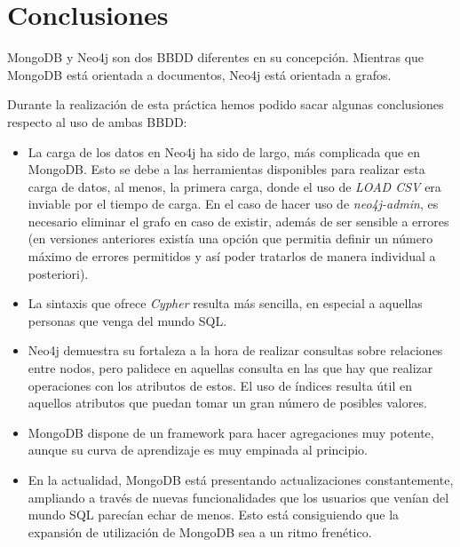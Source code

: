 \section*{Conclusiones}

MongoDB y Neo4j son dos \gls{BBDD} diferentes en su concepción. Mientras que MongoDB está orientada a documentos, Neo4j está orientada a grafos.

Durante la realización de esta práctica hemos podido sacar algunas conclusiones respecto al uso de ambas \gls{BBDD}:

\begin{itemize}
 \item La carga de los datos en Neo4j ha sido de largo, más complicada que en MongoDB. Esto se debe a las herramientas disponibles para realizar esta carga de datos, al menos, la primera carga, donde el uso de \textit{LOAD CSV} era inviable por el tiempo de carga. En el caso de hacer uso de \textit{neo4j-admin}, es necesario eliminar el grafo en caso de existir, además de ser sensible a errores (en versiones anteriores existía una opción que permitia definir un número máximo de errores permitidos y así poder tratarlos de manera individual a posteriori).
 \item La sintaxis que ofrece \textit{Cypher} resulta más sencilla, en especial a aquellas personas que venga del mundo \gls{SQL}.
 \item Neo4j demuestra su fortaleza a la hora de realizar consultas sobre relaciones entre nodos, pero palidece en aquellas consulta en las que hay que realizar operaciones con los atributos de estos. El uso de índices resulta útil en aquellos atributos que puedan tomar un gran número de posibles valores.
 \item MongoDB dispone de un framework para hacer agregaciones muy potente, aunque su curva de aprendizaje es muy empinada al principio.
 \item En la actualidad, MongoDB está presentando actualizaciones constantemente, ampliando a través de nuevas funcionalidades que los usuarios que venían del mundo \gls{SQL} parecían echar de menos. Esto está consiguiendo que la expansión de utilización de MongoDB sea a un ritmo frenético.
\end{itemize}